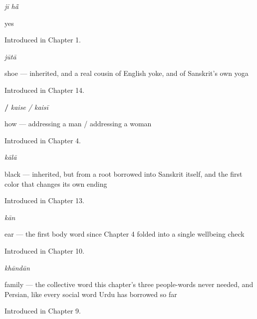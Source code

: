 \noindent\begin{minipage}[t]{\linewidth}
\raggedright
\textbf{ }\enspace\emph{jī hā̃}\par
\small yes\par
\footnotesize Introduced in Chapter 1.
\end{minipage}\par\medskip

\noindent\begin{minipage}[t]{\linewidth}
\raggedright
\textbf{}\enspace\emph{jūtā}\par
\small shoe — inherited, and a real cousin of English yoke, and of Sanskrit's own yoga\par
\footnotesize Introduced in Chapter 14.
\end{minipage}\par\medskip

\noindent\begin{minipage}[t]{\linewidth}
\raggedright
\textbf{ / }\enspace\emph{kaise / kaisī}\par
\small how — addressing a man / addressing a woman\par
\footnotesize Introduced in Chapter 4.
\end{minipage}\par\medskip

\noindent\begin{minipage}[t]{\linewidth}
\raggedright
\textbf{}\enspace\emph{kālā}\par
\small black — inherited, but from a root borrowed into Sanskrit itself, and the first color that changes its own ending\par
\footnotesize Introduced in Chapter 13.
\end{minipage}\par\medskip

\noindent\begin{minipage}[t]{\linewidth}
\raggedright
\textbf{}\enspace\emph{kān}\par
\small ear — the first body word since Chapter 4 folded    into a single wellbeing check\par
\footnotesize Introduced in Chapter 10.
\end{minipage}\par\medskip

\noindent\begin{minipage}[t]{\linewidth}
\raggedright
\textbf{}\enspace\emph{khāndān}\par
\small family — the collective word this chapter's three people-words never needed, and Persian, like every social word Urdu has borrowed so far\par
\footnotesize Introduced in Chapter 9.
\end{minipage}\par\medskip

